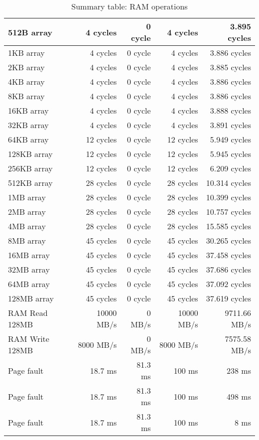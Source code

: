 \begin{table}[h]
\begin{center}
\begin{tabular}{| l | r | r | r | r |}
512B array	&	4 cycles	&	0 cycle		&	4 cycles	&3.895 cycles	\\ \hline
1KB array	&	4 cycles	&	0 cycle		&	4 cycles	&3.886 cycles		\\ \hline
2KB array	&	4 cycles	&	0 cycle		&	4 cycles	&3.885 cycles		\\ \hline
4KB array	&	4 cycles	&	0 cycle		&	4 cycles	&3.886 cycles		\\ \hline
8KB array	&	4 cycles	&	0 cycle		&	4 cycles	&3.886 cycles		\\ \hline
16KB	array	&	4 cycles	&	0 cycle		&	4 cycles	&3.888 cycles		\\ \hline
32KB array	&	4 cycles	&	0 cycle		&	4 cycles	&3.891 cycles		\\ \hline
64KB 	array	&	12 cycles	&	0 cycle		&	12 cycles	&5.949 cycles		\\ \hline
128KB array	&	12 cycles	&	0 cycle		&	12 cycles	&5.945 cycles		\\ \hline
256KB array	&	12 cycles	&	0 cycle		&	12 cycles	&6.209 cycles		\\ \hline
512KB array	&	28 cycles	&	0 cycle		&	28 cycles	&10.314 cycles		\\ \hline
1MB array	&	28 cycles	&	0 cycle		&	28 cycles	&10.399 cycles		\\ \hline
2MB array	&	28 cycles	&	0 cycle		&	28 cycles	&10.757 cycles		\\ \hline
4MB array	&	28 cycles	&	0 cycle		&	28 cycles	&15.585 cycles		\\ \hline
8MB array	&	45 cycles	&	0 cycle		&	45 cycles	&30.265 cycles		\\ \hline
16MB array	&	45 cycles	&	0 cycle		&	45 cycles	&37.458 cycles		\\ \hline
32MB array	&	45 cycles	&	0 cycle		&	45 cycles	&37.686 cycles		\\ \hline
64MB array	&	45 cycles	&	0 cycle		&	45 cycles	&37.092 cycles		\\ \hline
128MB array&	45 cycles	&	0 cycle		&	45 cycles	&37.619 cycles		\\ \hline \hline








RAM Read 128MB 	& 10000 MB/s	& 0 MB/s	& 10000 MB/s	& 9711.66 MB/s \\
\hline
RAM Write 128MB & 8000 MB/s	& 0 MB/s	& 8000 MB/s	& 7575.58 MB/s \\
\hline \hline

Page fault	& 18.7 ms	& 81.3 ms 	& 100 ms	& 238 ms\\ \hline
Page fault	& 18.7 ms	& 81.3 ms 	& 100 ms	& 498 ms\\ \hline
Page fault	& 18.7 ms	& 81.3 ms 	& 100 ms	& 8 ms\\ \hline



\end{tabular}
\end{center}
\caption{Summary table: RAM operations}

\end{table}






